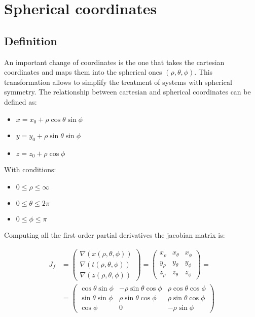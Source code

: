 \chapter{Spherical coordinates}

\section{Definition}
An important change of coordinates is the one that takes the cartesian coordinates and maps them into the spherical ones $(\rho, \theta, \phi)$.
This transformation allows to simplify the treatment of systems with spherical symmetry.
The relationship between cartesian and spherical coordinates can be defined as:

\begin{multicols}{3}
	\begin{itemize}
		\item $x = x_0 + \rho\cos\theta\sin\phi$
		\item $y = y_0 + \rho\sin\theta\sin\phi$
		\item $z = z_0 + \rho\cos\phi$
	\end{itemize}
\end{multicols}

With conditions:

\begin{multicols}{3}
	\begin{itemize}
		\item $0\le \rho\le \infty$
		\item $0 \le \theta\le 2\pi$
		\item $0 \le \phi\le \pi$
	\end{itemize}
\end{multicols}

Computing all the first order partial derivatives the jacobian matrix is:

\begin{align*}
	J_f &= \begin{pmatrix}\nabla(x(\rho, \theta, \phi))\\\nabla(t(\rho, \theta, \phi))\\\nabla(z(\rho,\theta,\phi))\end{pmatrix} = \begin{pmatrix} x_\rho & x_\theta & x_\phi\\y_\rho & y_\theta & y_\phi\\z_\rho & z_\theta & z_\phi\end{pmatrix}=\\
			&=\begin{pmatrix} \cos\theta\sin\phi & -\rho\sin\theta\cos\phi & \rho\cos\theta\cos\phi\\ \sin\theta\sin\phi & \rho\sin\theta\cos\phi & \rho\sin\theta\cos\phi\\\cos\phi & 0 & -\rho\sin\phi\end{pmatrix}
\end{align*}

